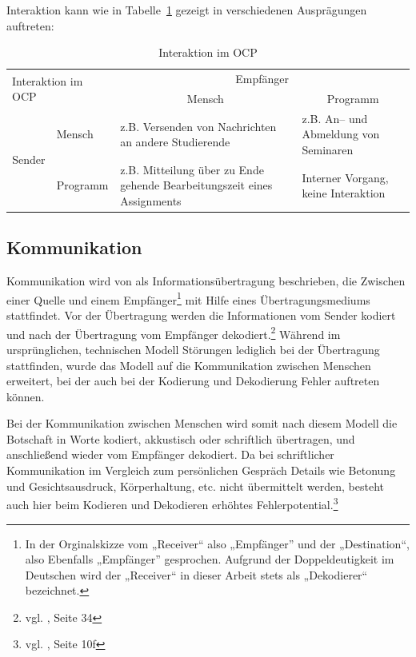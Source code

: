 Interaktion kann wie in Tabelle~\ref{tab:ocpinteractive} gezeigt in verschiedenen Ausprägungen auftreten:

\begin{table}[h]
\begin{tabular}{|l|l|m{4cm}|m{4cm}|}
\hline 
\multicolumn{2}{|l|}{\multirow{2}{*}{Interaktion im OCP}}                  & \multicolumn{2}{c|}{Empfänger}                                                                                 \\ \cline{3-4} 
\multicolumn{2}{|l|}{}                                   & \multicolumn{1}{c|}{Mensch}                                             & \multicolumn{1}{c|}{Programm}        \\ \hline
\multicolumn{1}{|c|}{\multirow{2}{*}{Sender}} & Mensch   & z.B. Versenden von Nachrichten an andere Studierende                    & z.B. An– und Abmeldung von Seminaren \\ \cline{2-4} 
\multicolumn{1}{|c|}{}                        & Programm & z.B. Mitteilung über zu Ende gehende Bearbeitungszeit eines Assignments & Interner Vorgang, keine Interaktion  \\ \hline
\end{tabular}
\caption{Interaktion im OCP}
\label{tab:ocpinteractive}
\end{table}


\subsection{Kommunikation} %
\label{sub:kommunikation}
Kommunikation wird von \cite{shannonweaver} als Informationsübertragung beschrieben, die Zwischen einer Quelle  und einem Empfänger\footnote{In der Orginalskizze vom „Receiver“ also „Empfänger” und der „Destination“, also Ebenfalls „Empfänger” gesprochen. Aufgrund der Doppeldeutigkeit im Deutschen wird der „Receiver“ in dieser Arbeit stets als „Dekodierer“ bezeichnet.} mit Hilfe eines Übertragungsmediums stattfindet. Vor der Übertragung werden die Informationen vom Sender kodiert und nach der Übertragung vom Empfänger dekodiert.\footnote{vgl. \cite{shannonweaver}, Seite 34} Während im ursprünglichen, technischen Modell Störungen lediglich bei der Übertragung stattfinden, wurde das Modell auf die Kommunikation zwischen Menschen erweitert, bei der auch bei der Kodierung und Dekodierung Fehler auftreten können.

Bei der Kommunikation zwischen Menschen wird somit nach diesem Modell die Botschaft in Worte kodiert, akkustisch oder schriftlich übertragen, und anschließend wieder vom Empfänger dekodiert. Da bei schriftlicher Kommunikation im Vergleich zum persönlichen Gespräch Details wie Betonung und Gesichtsausdruck, Körperhaltung, etc. nicht übermittelt werden, besteht auch hier beim Kodieren und Dekodieren erhöhtes Fehlerpotential.\footnote{vgl. \cite{rothe}, Seite 10f}

